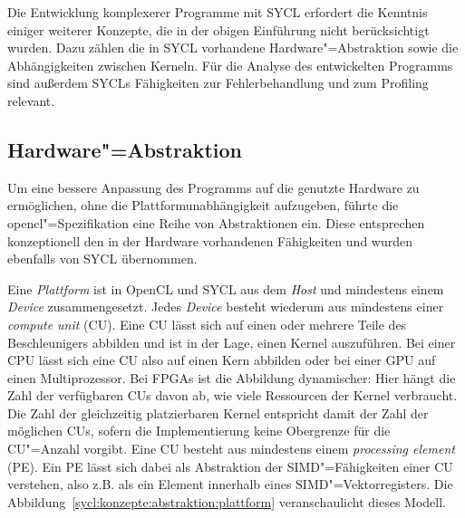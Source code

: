 Die Entwicklung komplexerer Programme mit SYCL erfordert die Kenntnis einiger
weiterer Konzepte, die in der obigen Einführung nicht berücksichtigt wurden.
Dazu zählen die in SYCL vorhandene Hardware"=Abstraktion sowie die
Abhängigkeiten zwischen Kerneln. Für die Analyse des entwickelten Programms
sind außerdem SYCLs Fähigkeiten zur Fehlerbehandlung und zum Profiling relevant.

\subsection{Hardware"=Abstraktion}

Um eine bessere Anpassung des Programms auf die genutzte Hardware zu
ermöglichen, ohne die Plattformunabhängigkeit aufzugeben, führte die
\gls{opencl}"=Spezifikation eine Reihe von Abstraktionen ein. Diese entsprechen
konzeptionell den in der Hardware vorhandenen Fähigkeiten und wurden ebenfalls
von SYCL übernommen.

Eine \textit{Plattform} ist in OpenCL und SYCL aus dem \textit{Host} und
mindestens einem \textit{Device} zusammengesetzt. Jedes \textit{Device} besteht
wiederum aus mindestens einer \textit{compute unit} (CU). Eine CU lässt sich auf
einen oder mehrere Teile des Beschleunigers abbilden und ist in der Lage, einen
Kernel auszuführen. Bei einer CPU lässt sich eine CU also auf einen
Kern abbilden oder bei einer GPU auf einen Multiprozessor. Bei FPGAs ist die
Abbildung dynamischer: Hier hängt die Zahl der verfügbaren CUs davon ab, wie
viele Ressourcen der Kernel verbraucht. Die Zahl der gleichzeitig platzierbaren
Kernel entspricht damit der Zahl der möglichen CUs, sofern die Implementierung
keine Obergrenze für die CU"=Anzahl vorgibt. Eine CU besteht aus mindestens
einem \textit{processing element} (PE). Ein PE lässt sich dabei als Abstraktion
der SIMD"=Fähigkeiten einer CU verstehen, also z.B. als ein Element innerhalb
eines SIMD"=Vektorregisters.
Die Abbildung~\ref{sycl:konzepte:abstraktion:plattform} veranschaulicht dieses
Modell.

